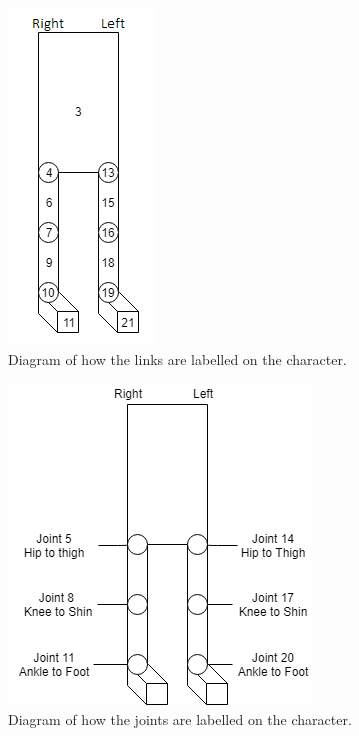 \documentclass[12pt, a4paper]{article}
\begin{document}
\begin{figure}
\begin{center}
\includegraphics[scale=0.8]{link_labels}
\caption{Diagram of how the links are labelled on the character.}
\label{fig: link labels}
\end{center}
\end{figure}

\begin{figure}
\begin{center}
\includegraphics[scale=0.8]{joint_labels}
\caption{Diagram of how the joints are labelled on the character.}
\label{fig: joint labels}
\end{center}
\end{figure}

\newpage
{}
\end{document}
